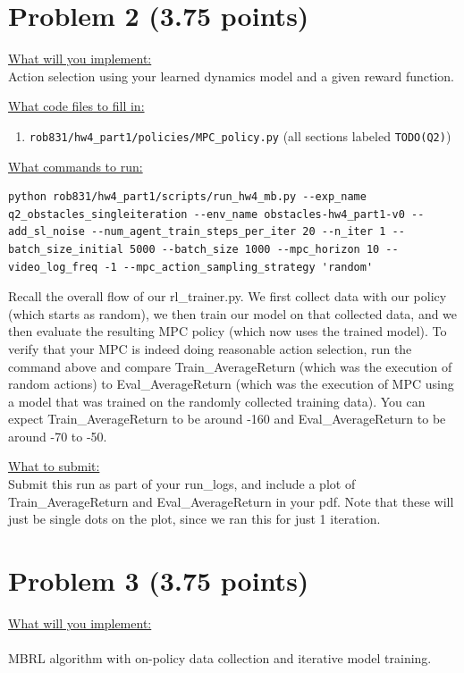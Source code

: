 \documentclass{article} %
\begin{document}
\section*{Problem 2 (3.75 points)}

\underline{What will you implement:}\\
Action selection using your learned dynamics model and a given reward function.

\underline{What code files to fill in:}
\begin{enumerate}
    \item \verb+rob831/hw4_part1/policies/MPC_policy.py+ (all sections labeled \verb+TODO(Q2)+)
\end{enumerate}

\underline{What commands to run:}\\
\begin{lstlisting}[escapechar=@]
python rob831/hw4_part1/scripts/run_hw4_mb.py --exp_name q2_obstacles_singleiteration --env_name obstacles-hw4_part1-v0 --add_sl_noise --num_agent_train_steps_per_iter 20 --n_iter 1 --batch_size_initial 5000 --batch_size 1000 --mpc_horizon 10 --video_log_freq -1 --mpc_action_sampling_strategy 'random'
\end{lstlisting}

Recall the overall flow of our rl\_trainer.py. We first collect data with our policy (which starts as random), we then train our model on that collected data, and we then evaluate the resulting MPC policy (which now uses the trained model). To verify that your MPC is indeed doing reasonable action selection, run the command above and compare Train\_AverageReturn (which was the execution of random actions) to Eval\_AverageReturn (which was the execution of MPC using a model that was trained on the randomly collected training data). You can expect Train\_AverageReturn to be around -160 and Eval\_AverageReturn to be around -70 to -50.

\underline{What to submit:}\\
Submit this run as part of your run\_logs, and include a plot of Train\_AverageReturn and Eval\_AverageReturn in your pdf. Note that these will just be single dots on the plot, since we ran this for just 1 iteration.


\newpage
\section*{Problem 3 (3.75 points)}

\underline{What will you implement:}\\ \\
MBRL algorithm with on-policy data collection and iterative model training.
\end{document}
